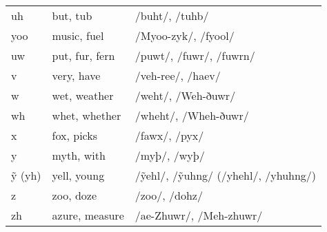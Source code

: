 \documentclass[
  letterpaper,
]{book}
\begin{document}
\begin{longtable}[]{@{}lll@{}}
uh & but, tub & /buht/, /tuhb/ \\
yoo & music, fuel & /Myoo-zyk/, /fyool/ \\
uw & put, fur, fern & /puwt/, /fuwr/, /fuwrn/ \\
v & very, have & /veh-ree/, /haev/ \\
w & wet, weather & /weht/, /Weh-ðuwr/ \\
wh & whet, whether & /wheht/, /Wheh-ðuwr/ \\
x & fox, picks & /fawx/, /pyx/ \\
y & myth, with & /myþ/, /wyþ/ \\
ỹ (yh) & yell, young & /ỹehl/, /ỹuhng/ (/yhehl/, /yhuhng/) \\
z & zoo, doze & /zoo/, /dohz/ \\
zh & azure, measure & /ae-Zhuwr/, /Meh-zhuwr/ \\
\end{longtable}


\backmatter
\end{document}
